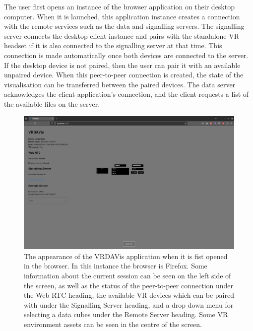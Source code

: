 The user first opens an instance of the browser application on their desktop computer. 
When it is launched, this application instance creates a connection with the remote services such as the data and signalling servers. 
The signalling server connects the desktop client instance and pairs with the standalone VR headset if it is also connected to the signalling server at that time. 
This connection is made automatically once both devices are connected to the server. 
If the desktop device is not paired, then the user can pair it with an available unpaired device. 
When this peer-to-peer connection is created, the state of the visualisation can be transferred between the paired devices. 
The data server acknowledges the client application's connection, and the client requests a list of the available files on the server.

\begin{figure}
    \centering
    \includegraphics[width=\linewidth]{figures/screenshots/1.png}
    \caption{The appearance of the VRDAVis application when it is fist opened in the browser. In this instance the browser is Firefox. Some information about the current session can be seen on the left side of the screen, as well as the status of the peer-to-peer connection under the Web RTC heading, the available VR devices which can be paired with under the Signalling Server heading, and a drop down menu for selecting a data cubes under the Remote Server heading. Some VR environment assets can be seen in the centre of the screen.}
    \label{fig:screenshot-1}
\end{figure}

